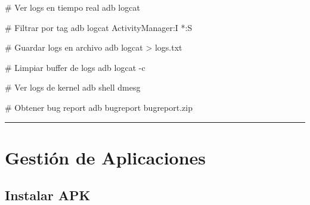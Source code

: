 \documentclass[
  doc,
  floatsintext,
  longtable,
  a4paper,
  nolmodern,
  notxfonts,
  notimes,
  12pt,
  colorlinks=true,linkcolor=blue,citecolor=blue,urlcolor=blue]{apa7}
\newenvironment{Shaded}{\begin{snugshade}}{\end{snugshade}}
\newcommand{\AttributeTok}[1]{\textcolor[rgb]{0.40,0.45,0.13}{#1}}
\newcommand{\CommentTok}[1]{\textcolor[rgb]{0.37,0.37,0.37}{#1}}
\newcommand{\ExtensionTok}[1]{\textcolor[rgb]{0.00,0.23,0.31}{#1}}
\newcommand{\NormalTok}[1]{\textcolor[rgb]{0.00,0.23,0.31}{#1}}
\newcommand{\OperatorTok}[1]{\textcolor[rgb]{0.37,0.37,0.37}{#1}}
\newcommand{\PreprocessorTok}[1]{\textcolor[rgb]{0.68,0.00,0.00}{#1}}
\begin{document}
\begin{Shaded}
\begin{Highlighting}[]
\CommentTok{\# Ver logs en tiempo real}
\ExtensionTok{adb}\NormalTok{ logcat}

\CommentTok{\# Filtrar por tag}
\ExtensionTok{adb}\NormalTok{ logcat ActivityManager:I }\PreprocessorTok{*}\NormalTok{:S}

\CommentTok{\# Guardar logs en archivo}
\ExtensionTok{adb}\NormalTok{ logcat }\OperatorTok{\textgreater{}}\NormalTok{ logs.txt}

\CommentTok{\# Limpiar buffer de logs}
\ExtensionTok{adb}\NormalTok{ logcat }\AttributeTok{{-}c}

\CommentTok{\# Ver logs de kernel}
\ExtensionTok{adb}\NormalTok{ shell dmesg}

\CommentTok{\# Obtener bug report}
\ExtensionTok{adb}\NormalTok{ bugreport bugreport.zip}
\end{Highlighting}
\end{Shaded}

\begin{center}\rule{0.5\linewidth}{0.5pt}\end{center}

\section{Gestión de Aplicaciones}\label{gestiuxf3n-de-aplicaciones}

\subsection{Instalar APK}\label{instalar-apk}
\end{document}
